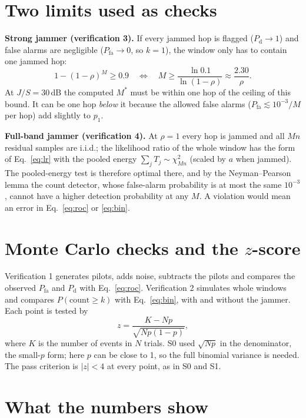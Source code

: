 \documentclass[11pt,a4paper]{article}
\newcommand{\Pfa}{P_{\mathrm{fa}}}
\newcommand{\Pd}{P_{\mathrm{d}}}
\begin{document}
\section{Two limits used as checks}

\textbf{Strong jammer (verification 3).} If every jammed hop is flagged
($\Pd\to1$) and false alarms are negligible ($\Pfa\to0$, so $k=1$), the window
only has to contain one jammed hop:
\begin{equation}
1-(1-\rho)^{M} \ge 0.9 \quad\Longleftrightarrow\quad
M \ge \frac{\ln 0.1}{\ln(1-\rho)} \approx \frac{2.30}{\rho}.
\label{eq:limit}
\end{equation}
At $J/S = 30$\,dB the computed $M^\ast$ must be within one hop of the ceiling of
this bound. It can be one hop \emph{below} it because the allowed false alarms
($\Pfa \lesssim 10^{-3}/M$ per hop) add slightly to $p_1$.

\textbf{Full-band jammer (verification 4).} At $\rho=1$ every hop is jammed and
all $Mn$ residual samples are i.i.d.; the likelihood ratio of the whole window has
the form of Eq.~\eqref{eq:lr} with the pooled energy
$\sum_j T_j\sim\chi^2_{Mn}$ (scaled by $a$ when jammed). The pooled-energy test is
therefore optimal there, and by the Neyman--Pearson lemma the count detector,
whose false-alarm probability is at most the same $10^{-3}$, cannot have a higher
detection probability at any $M$. A violation would mean an error in
Eq.~\eqref{eq:roc} or \eqref{eq:bin}.

\section{Monte Carlo checks and the $z$-score}

Verification 1 generates pilots, adds noise, subtracts the pilots and compares
the observed $\Pfa$ and $\Pd$ with Eq.~\eqref{eq:roc}. Verification 2 simulates
whole windows and compares $P(\text{count}\ge k)$ with Eq.~\eqref{eq:bin}, with
and without the jammer. Each point is tested by
\begin{equation}
z = \frac{K - Np}{\sqrt{Np(1-p)}},
\end{equation}
where $K$ is the number of events in $N$ trials. S0 used $\sqrt{Np}$ in the
denominator, the small-$p$ form; here $p$ can be close to 1, so the full binomial
variance is needed. The pass criterion is $|z|<4$ at every point, as in S0 and S1.

\section{What the numbers show}
\end{document}
